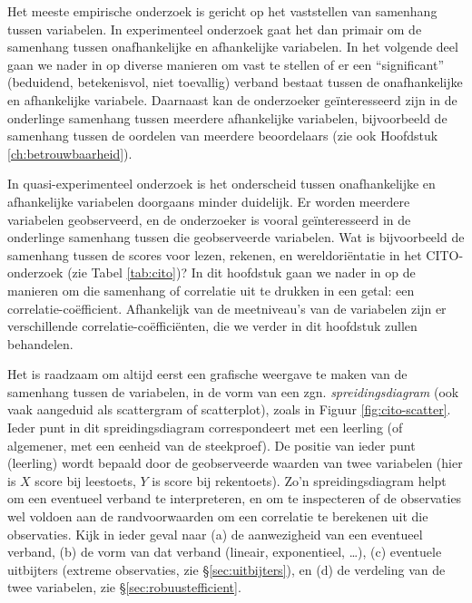 \documentclass[
]{book}
\begin{document}
Het meeste empirische onderzoek is gericht op het vaststellen van
samenhang tussen variabelen. In experimenteel onderzoek gaat het dan
primair om de samenhang tussen onafhankelijke en afhankelijke
variabelen. In het volgende deel gaan we nader in op diverse manieren om
vast te stellen of er een ``significant'' (beduidend, betekenisvol, niet
toevallig) verband bestaat tussen de onafhankelijke en afhankelijke
variabele. Daarnaast kan de onderzoeker geïnteresseerd zijn in de
onderlinge samenhang tussen meerdere afhankelijke variabelen,
bijvoorbeeld de samenhang tussen de oordelen van meerdere beoordelaars
(zie ook Hoofdstuk \ref{ch:betrouwbaarheid}).

In quasi-experimenteel onderzoek is het onderscheid tussen
onafhankelijke en afhankelijke variabelen doorgaans minder duidelijk. Er
worden meerdere variabelen geobserveerd, en de onderzoeker is vooral
geïnteresseerd in de onderlinge samenhang tussen die geobserveerde
variabelen. Wat is bijvoorbeeld de samenhang tussen de scores voor
lezen, rekenen, en wereldoriëntatie in het CITO-onderzoek (zie
Tabel \ref{tab:cito})? In dit hoofdstuk gaan we nader in op de manieren
om die samenhang of correlatie uit te drukken in een getal: een
correlatie-coëfficient. Afhankelijk van de meetniveau's van de
variabelen zijn er verschillende correlatie-coëfficiënten, die we verder
in dit hoofdstuk zullen behandelen.

Het is raadzaam om altijd eerst een grafische weergave te maken van de
samenhang tussen de variabelen, in de vorm van een zgn.
\emph{spreidingsdiagram} (ook vaak aangeduid als scattergram of scatterplot),
zoals in Figuur \ref{fig:cito-scatter}. Ieder punt in dit spreidingsdiagram
correspondeert met een leerling (of algemener, met een eenheid van de
steekproef). De positie van ieder punt (leerling) wordt bepaald door de
geobserveerde waarden van twee variabelen (hier is \(X\) score bij
leestoets, \(Y\) is score bij rekentoets). Zo'n spreidingsdiagram helpt om
een eventueel verband te interpreteren, en om te inspecteren of de
observaties wel voldoen aan de randvoorwaarden om een correlatie te
berekenen uit die observaties. Kijk in ieder geval naar (a) de
aanwezigheid van een eventueel verband, (b) de vorm van dat verband
(lineair, exponentieel, \ldots), (c) eventuele uitbijters (extreme
observaties, zie §\ref{sec:uitbijters}), en (d) de verdeling van de twee
variabelen, zie §\ref{sec:robuustefficient}.
\end{document}
